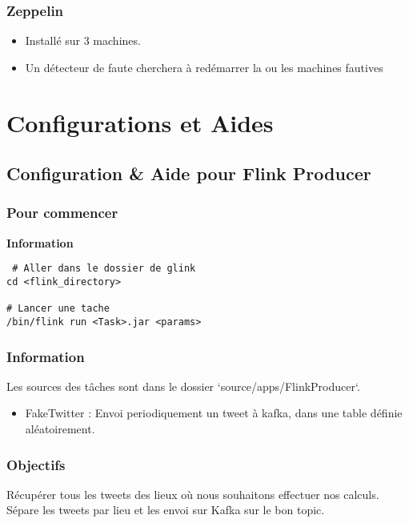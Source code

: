 \documentclass[a4paper,oneside,11pt]{article}
\begin{document}
\subsubsection{Zeppelin}

\begin{itemize}
\item Installé sur 3 machines. 
\item Un détecteur de faute cherchera à redémarrer la ou les machines fautives 
\end{itemize}

\section{Configurations et Aides}

\subsection{Configuration \& Aide pour Flink Producer}

\subsubsection{Pour commencer}

\textbf{Information}

\begin{verbatim}
 # Aller dans le dossier de glink
cd <flink_directory>

# Lancer une tache
/bin/flink run <Task>.jar <params>
\end{verbatim}

\subsubsection{Information}

Les sources des tâches sont dans le dossier `source/apps/FlinkProducer`. 

\begin{itemize}
\item FakeTwitter : Envoi periodiquement un tweet à kafka, dans une table définie aléatoirement. 
\end{itemize} 


\subsubsection{Objectifs}

Récupérer tous les tweets des lieux où nous souhaitons effectuer nos calculs. Sépare les tweets par lieu et les envoi sur Kafka sur le bon topic. 
\end{document}
